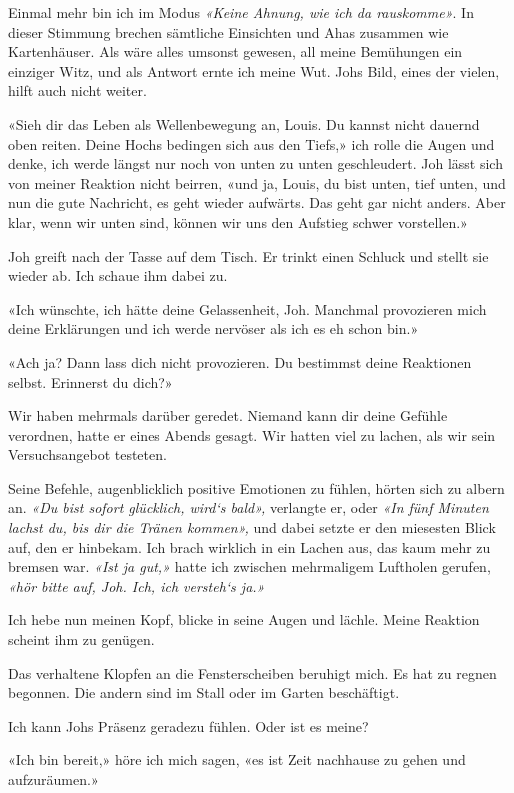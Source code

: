 Einmal mehr bin ich im Modus \emph{«Keine Ahnung, wie ich da
rauskomme»}. In dieser Stimmung brechen sämtliche Einsichten und Ahas
zusammen wie Kartenhäuser. Als wäre alles umsonst gewesen, all meine
Bemühungen ein einziger Witz, und als Antwort ernte ich meine Wut. Johs
Bild, eines der vielen, hilft auch nicht weiter.

«Sieh dir das Leben als Wellenbewegung an, Louis. Du kannst nicht
dauernd oben reiten. Deine Hochs bedingen sich aus den Tiefs,» ich rolle
die Augen und denke, ich werde längst nur noch von unten zu unten
geschleudert. Joh lässt sich von meiner Reaktion nicht beirren, «und ja,
Louis, du bist unten, tief unten, und nun die gute Nachricht, es geht
wieder aufwärts. Das geht gar nicht anders. Aber klar, wenn wir unten
sind, können wir uns den Aufstieg schwer vorstellen.»

Joh greift nach der Tasse auf dem Tisch. Er trinkt einen Schluck und
stellt sie wieder ab. Ich schaue ihm dabei zu.

«Ich wünschte, ich hätte deine Gelassenheit, Joh. Manchmal provozieren
mich deine Erklärungen und ich werde nervöser als ich es eh schon bin.»

«Ach ja? Dann lass dich nicht provozieren. Du bestimmst deine Reaktionen
selbst. Erinnerst du dich?»

Wir haben mehrmals darüber geredet. Niemand kann dir deine Gefühle
verordnen, hatte er eines Abends gesagt. Wir hatten viel zu lachen, als
wir sein Versuchsangebot testeten.

Seine Befehle, augenblicklich positive Emotionen zu fühlen, hörten sich
zu albern an. \emph{«Du bist sofort glücklich, wird`s bald»,} verlangte
er, oder \emph{«In fünf Minuten lachst du, bis dir die Tränen kommen»,}
und dabei setzte er den miesesten Blick auf, den er hinbekam. Ich brach
wirklich in ein Lachen aus, das kaum mehr zu bremsen war. \emph{«Ist ja
gut,»} hatte ich zwischen mehrmaligem Luftholen gerufen, \emph{«hör
bitte auf, Joh. Ich, ich versteh`s ja.»}

Ich hebe nun meinen Kopf, blicke in seine Augen und lächle. Meine
Reaktion scheint ihm zu genügen.

Das verhaltene Klopfen an die Fensterscheiben beruhigt mich. Es hat zu
regnen begonnen. Die andern sind im Stall oder im Garten beschäftigt.

Ich kann Johs Präsenz geradezu fühlen. Oder ist es meine?

«Ich bin bereit,» höre ich mich sagen, «es ist Zeit nachhause zu gehen
und aufzuräumen.»

